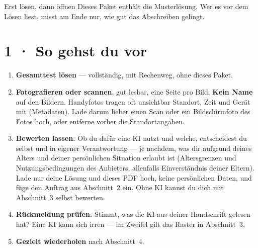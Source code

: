 \documentclass[11pt]{article}
\begin{document}

\begin{lpachtung}{Erst lösen, dann öffnen}
Dieses Paket enthält die Musterlösung. Wer es vor dem Lösen liest, misst am Ende nur, wie gut das Abschreiben gelingt.
\end{lpachtung}

\section*{1 · So gehst du vor}
\begin{enumerate}[leftmargin=*,itemsep=2pt]
\item \textbf{Gesamttest lösen} — vollständig, mit Rechenweg, ohne dieses Paket.
\item \textbf{Fotografieren oder scannen}, gut lesbar, eine Seite pro Bild. \textbf{Kein Name} auf den Bildern.
  Handyfotos tragen oft unsichtbar Standort, Zeit und Gerät mit (Metadaten). Lade darum lieber einen Scan oder ein
  Bildschirmfoto des Fotos hoch, oder entferne vorher die Standortangaben.
\item \textbf{Bewerten lassen.} Ob du dafür eine KI nutzt und welche, entscheidest du selbst und in eigener Verantwortung —
  je nachdem, was dir aufgrund deines Alters und deiner persönlichen Situation erlaubt ist (Altersgrenzen und
  Nutzungsbedingungen des Anbieters, allenfalls Einverständnis deiner Eltern). Lade nur deine Lösung und dieses PDF hoch,
  keine persönlichen Daten, und füge den Auftrag aus Abschnitt~2 ein. Ohne KI kannst du dich mit Abschnitt~3 selbst bewerten.
\item \textbf{Rückmeldung prüfen.} Stimmt, was die KI aus deiner Handschrift gelesen hat? Eine KI kann sich irren —
  im Zweifel gilt das Raster in Abschnitt~3.
\item \textbf{Gezielt wiederholen} nach Abschnitt~4.
\end{enumerate}

\end{document}
